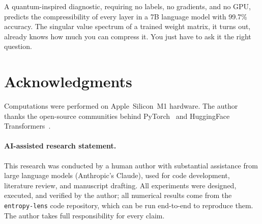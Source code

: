\documentclass[11pt,a4paper]{article}
\begin{document}
A quantum-inspired diagnostic, requiring no labels, no gradients,
and no GPU, predicts the compressibility of every layer in a 7B
language model with 99.7\% accuracy.  The singular value spectrum
of a trained weight matrix, it turns out, already knows how much
you can compress it.  You just have to ask it the right question.


\section*{Acknowledgments}

Computations were performed on Apple~Silicon~M1 hardware.  The
author thanks the open-source communities behind
PyTorch~\citep{Paszke2019} and HuggingFace
Transformers~\citep{Wolf2020}.

\paragraph{AI-assisted research statement.}
This research was conducted by a human author with substantial
assistance from large language models (Anthropic's Claude), used for
code development, literature review, and manuscript drafting.  All
experiments were designed, executed, and verified by the author; all
numerical results come from the \texttt{entropy-lens} code
repository, which can be run end-to-end to reproduce them.  The
author takes full responsibility for every claim.




\end{document}
